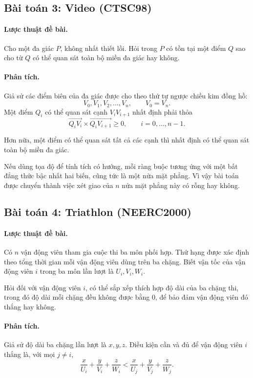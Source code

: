 \documentclass[11pt]{article}
\begin{document}
\subsection{Bài toán 3: Video (CTSC98)}

\paragraph{Lược thuật đề bài.}
Cho một đa giác \(P\), không nhất thiết lồi. Hỏi trong \(P\) có tồn tại một
điểm \(Q\) sao cho từ \(Q\) có thể quan sát toàn bộ miền đa giác hay không.

\paragraph{Phân tích.}
Giả sử các điểm biên của đa giác được cho theo thứ tự ngược chiều kim đồng
hồ:
\[
  V_0,V_1,V_2,\ldots,V_n,\qquad V_0=V_n.
\]
Một điểm \(Q_i\) có thể quan sát cạnh \(V_iV_{i+1}\) nhất định phải thỏa
\[
  \overrightarrow{Q_iV_i}\times
  \overrightarrow{Q_iV_{i+1}}\ge 0,\qquad i=0,\ldots,n-1.
\]

Hơn nữa, một điểm có thể quan sát tất cả các cạnh thì nhất định có thể quan
sát toàn bộ miền đa giác.

Nếu dùng tọa độ để tính tích có hướng, mỗi ràng buộc tương ứng với một bất
đẳng thức bậc nhất hai biến, cũng tức là một nửa mặt phẳng. Vì vậy bài toán
được chuyển thành việc xét giao của \(n\) nửa mặt phẳng này có rỗng hay
không.

\subsection{Bài toán 4: Triathlon (NEERC2000)}

\paragraph{Lược thuật đề bài.}
Có \(n\) vận động viên tham gia cuộc thi ba môn phối hợp. Thứ hạng được xác
định theo tổng thời gian mỗi vận động viên dùng trên ba chặng. Biết vận tốc
của vận động viên \(i\) trong ba môn lần lượt là \(U_i,V_i,W_i\).

Hỏi đối với vận động viên \(i\), có thể sắp xếp thích hợp độ dài của ba chặng
thi, trong đó độ dài mỗi chặng đều không được bằng \(0\), để bảo đảm vận động
viên đó thắng hay không.

\paragraph{Phân tích.}
Giả sử độ dài ba chặng lần lượt là \(x,y,z\). Điều kiện cần và đủ để vận động
viên \(i\) thắng là, với mọi \(j\ne i\),
\[
  \frac{x}{U_i}+\frac{y}{V_i}+\frac{z}{W_i}
  <
  \frac{x}{U_j}+\frac{y}{V_j}+\frac{z}{W_j}.
\]
\end{document}

